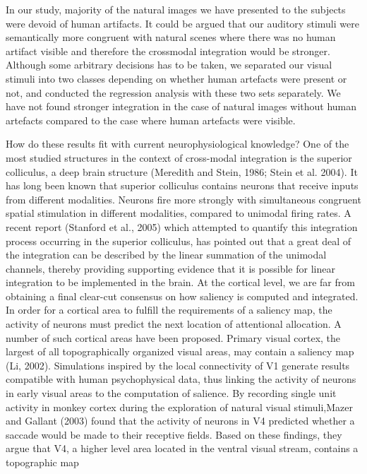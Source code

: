 In our study, majority of the natural images we have presented to the
subjects were devoid of human artifacts. It could be argued that our
auditory stimuli were semantically more congruent with natural scenes where
there was no human artifact visible and therefore the crossmodal
integration would be stronger. Although some arbitrary decisions has to be
taken, we separated our visual stimuli into two classes depending on
whether human artefacts were present or not, and conducted the regression
analysis with these two sets separately. We have not found stronger
integration in the case of natural images without human artefacts compared
to the case where human artefacts were visible. 

How do these results fit with current neurophysiological knowledge? One of
the most studied structures in the context of cross-modal integration is
the superior colliculus, a deep brain structure (Meredith and Stein, 1986;
Stein et al. 2004). It has long been known that superior colliculus
contains neurons that receive inputs from different modalities. Neurons
fire more strongly with simultaneous congruent spatial stimulation in
different modalities, compared to unimodal firing rates. A recent report
(Stanford et al., 2005) which attempted to quantify this integration
process occurring in the superior colliculus, has pointed out that a great
deal of the integration can be described by the linear summation of the
unimodal channels, thereby providing supporting evidence that it is
possible for linear integration to be implemented in the brain. At the
cortical level, we are far from obtaining a final clear-cut consensus on
how saliency is computed and integrated. In order for a cortical area to
fulfill the requirements of a saliency map, the activity of neurons must
predict the next location of attentional allocation. A number of such
cortical areas have been proposed. Primary visual cortex, the largest of
all topographically organized visual areas, may contain a saliency map (Li,
2002). Simulations inspired by the local connectivity of V1 generate
results compatible with human psychophysical data, thus linking the
activity of neurons in early visual areas to the computation of salience.
By recording single unit activity in monkey cortex during the exploration
of natural visual stimuli,Mazer and Gallant (2003) found that the activity
of neurons in V4 predicted whether a saccade would be made to their
receptive fields. Based on these findings, they argue that V4, a higher
level area located in the ventral visual stream, contains a topographic map
